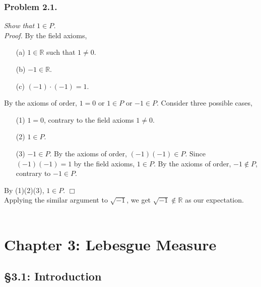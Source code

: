 \documentclass{article}
\begin{document}
\subsubsection*{Problem 2.1.}
\emph{Show that $1 \in P$.} \\

\emph{Proof.}
By the field axioms,
\begin{enumerate}
\item[(a)]
$1 \in \mathbb{R}$ such that $1 \neq 0$.
\item[(b)]
$-1 \in \mathbb{R}$.
\item[(c)]
$(-1) \cdot (-1) = 1$.
\end{enumerate}

By the axioms of order,
$1 = 0$ or $1 \in P$ or $-1 \in P$.
Consider three possible cases,
\begin{enumerate}
\item[(1)]
$1 = 0$, contrary to the field axioms $1 \neq 0$.
\item[(2)]
$1 \in P$.
\item[(3)]
$-1 \in P$.
By the axioms of order, $(-1)(-1) \in P$.
Since $(-1)(-1) = 1$ by the field axioms, $1 \in P$.
By the axioms of order, $-1 \not\in P$, contrary to $-1 \in P$.
\end{enumerate}
By (1)(2)(3), $1 \in P$.
$\Box$ \\

Applying the similar argument to $\sqrt{-1}$,
we get $\sqrt{-1} \not\in \mathbb{R}$
as our expectation. \\\\






\newpage
\section*{Chapter 3: Lebesgue Measure \\}



\subsection*{\S 3.1: Introduction \\}
\end{document}
